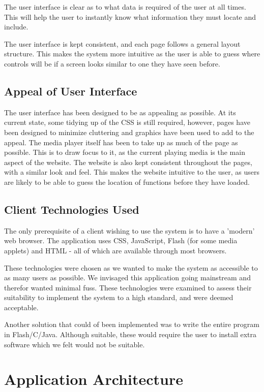 \documentclass{sig-alt-release2}
\begin{document}
The user interface is clear as to what data is required of the user at all times. This will help the user to instantly know what information they must locate and include. 

The user interface is kept consistent, and each page follows a general layout structure. This makes the system more intuitive as the user is able to guess where controls will be if a screen looks similar to one they have seen before.

\subsection{Appeal of User Interface}
The user interface has been designed to be as appealing as possible. At its current state, some tidying up of the CSS is still required, however, pages have been designed to minimize cluttering and graphics have been used to add to the appeal.
The media player itself has been to take up as much of the page as possible. This is to draw focus to it, as the current playing media is the main aspect of the website. 
The website is also kept consistent throughout the pages, with a similar look and feel. This makes the website intuitive to the user, as users are likely to be able to guess the location of functions before they have loaded.

\subsection{Client Technologies Used}
The only prerequisite of a client wishing to use the system is to have a 'modern' web browser. The application uses CSS, JavaScript, Flash (for some media applets) and HTML - all of which are available through most browsers. 

These technologies were chosen as we wanted to make the system as accessible to as many users as possible. We invisaged this application going mainstream and therefor wanted minimal fuss. These technologies were examined to assess their suitability to implement the system to a high standard, and were deemed acceptable.

Another solution that could of been implemented was to write the entire program in Flash/C/Java. Although suitable, these would require the user to install extra software which we felt would not be suitable.
\section{Application Architecture}

\end{document}
